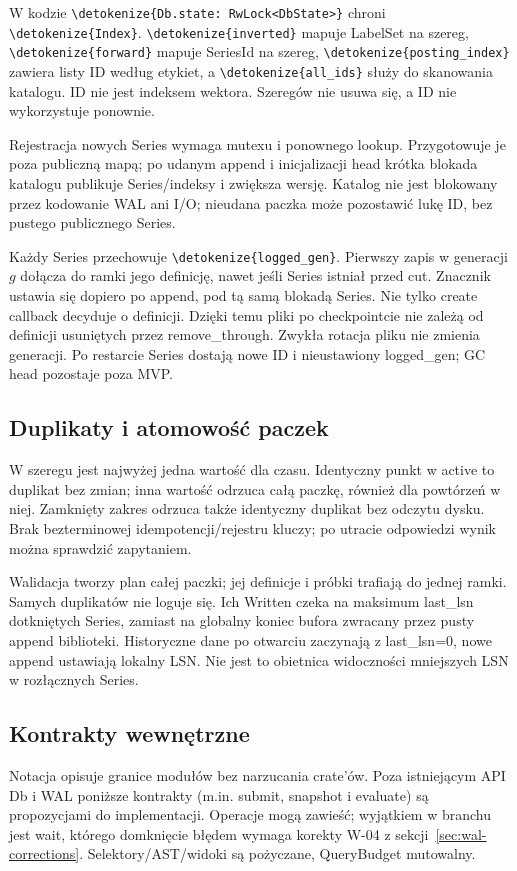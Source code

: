 \documentclass[11pt,a4paper]{article}
\newcommand{\code}[1]{\expandafter\nolinkurl\expandafter{\detokenize{#1}}}
\begin{document}
W kodzie \code{Db.state: RwLock<DbState>} chroni \code{Index}.
\code{inverted} mapuje LabelSet na szereg, \code{forward} mapuje SeriesId
na szereg, \code{posting_index} zawiera listy ID według etykiet,
a \code{all_ids} służy do skanowania katalogu. ID nie jest indeksem wektora. Szeregów nie usuwa się, a ID nie wykorzystuje ponownie.

Rejestracja nowych Series wymaga mutexu i ponownego lookup. Przygotowuje je
poza publiczną mapą; po udanym append i inicjalizacji head krótka
blokada katalogu publikuje Series/indeksy i zwiększa wersję.
Katalog nie jest blokowany przez kodowanie WAL ani I/O;
nieudana paczka może pozostawić lukę ID, bez pustego publicznego Series.

Każdy Series przechowuje \code{logged_gen}. Pierwszy zapis w generacji $g$
dołącza do ramki jego definicję, nawet jeśli Series istniał przed cut.
Znacznik ustawia się dopiero po append, pod tą samą blokadą Series.
Nie tylko create callback decyduje o definicji.
Dzięki temu pliki po checkpointcie nie zależą od definicji usuniętych
przez remove\_through. Zwykła rotacja pliku nie zmienia generacji.
Po restarcie Series dostają nowe ID i nieustawiony logged\_gen;
GC head pozostaje poza MVP.

\subsection{Duplikaty i atomowość paczek}
W szeregu jest najwyżej jedna wartość dla czasu. Identyczny punkt
w active to duplikat bez zmian; inna wartość odrzuca całą paczkę,
również dla powtórzeń w niej. Zamknięty zakres odrzuca także identyczny
duplikat bez odczytu dysku. Brak bezterminowej idempotencji/rejestru kluczy;
po utracie odpowiedzi wynik można sprawdzić zapytaniem.

Walidacja tworzy plan całej paczki; jej definicje i próbki trafiają do
jednej ramki. Samych duplikatów nie loguje się. Ich Written czeka na
maksimum last\_lsn dotkniętych Series, zamiast na globalny koniec bufora
zwracany przez pusty append biblioteki. Historyczne dane po otwarciu
zaczynają z last\_lsn=0, nowe append ustawiają lokalny LSN.
Nie jest to obietnica widoczności mniejszych LSN w rozłącznych Series.

\subsection{Kontrakty wewnętrzne}
Notacja opisuje granice modułów bez narzucania crate'ów.
Poza istniejącym API Db i WAL poniższe kontrakty (m.in. submit,
snapshot i evaluate) są propozycjami do implementacji.
Operacje mogą zawieść; wyjątkiem w branchu jest wait, którego
domknięcie błędem wymaga korekty W-04 z sekcji~\ref{sec:wal-corrections}.
Selektory/AST/widoki są pożyczane, QueryBudget mutowalny.
\end{document}
